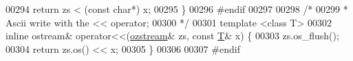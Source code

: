 \begin{DoxyCode}
00294     \textcolor{keywordflow}{return} zs < (\textcolor{keyword}{const} \textcolor{keywordtype}{char}*) x;
00295 \}
00296 \textcolor{preprocessor}{#endif}
00297 
00298 \textcolor{comment}{/*}
00299 \textcolor{comment}{ * Ascii write with the << operator;}
00300 \textcolor{comment}{ */}
00301 \textcolor{keyword}{template} <\textcolor{keyword}{class} T>
00302 \textcolor{keyword}{inline} ostream& operator<<(\hyperlink{classozstream}{ozstream}& zs, \textcolor{keyword}{const} \hyperlink{group___sparse_core___module}{T}& x) \{
00303     zs.os\_flush();
00304     \textcolor{keywordflow}{return} zs.os() << x;
00305 \}
00306 
00307 \textcolor{preprocessor}{#endif}
\end{DoxyCode}
